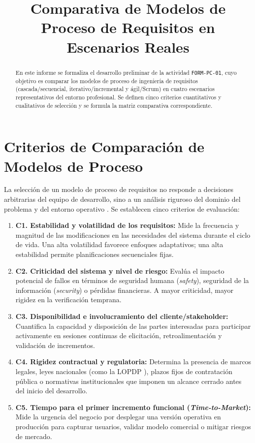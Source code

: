 \documentclass[conference]{IEEEtran}
\title{Comparativa de Modelos de Proceso de Requisitos en Escenarios Reales}
\author{
	\IEEEauthorblockN{José Ignacio Gilces Carranza}
	\IEEEauthorblockA{Universidad Técnica Estatal de Quevedo (UTEQ) --- Facultad de Ciencias de la Computación\\
		Ingeniería de Software $\cdot$ Ingeniería de Requerimientos (ISR-401) $\cdot$ Práctica en clase FORM-PC-01}
}
\begin{document}
	\onecolumn
	\maketitle
	
	\begin{abstract}
		En este informe se formaliza el desarrollo preliminar de la actividad \texttt{FORM-PC-01}, cuyo objetivo es comparar los modelos de proceso de ingeniería de requisitos (cascada/secuencial, iterativo/incremental y ágil/Scrum) en cuatro escenarios representativos del entorno profesional. Se definen cinco criterios cuantitativos y cualitativos de selección y se formula la matriz comparativa correspondiente.
	\end{abstract}
	
	\section{Criterios de Comparación de Modelos de Proceso}
	La selección de un modelo de proceso de requisitos no responde a decisiones arbitrarias del equipo de desarrollo, sino a un análisis riguroso del dominio del problema y del entorno operativo \cite{pohl2025, swebok2024}. Se establecen cinco criterios de evaluación:
	
	\begin{enumerate}
		\item \textbf{C1. Estabilidad y volatilidad de los requisitos:} Mide la frecuencia y magnitud de las modificaciones en las necesidades del sistema durante el ciclo de vida. Una alta volatilidad favorece enfoques adaptativos; una alta estabilidad permite planificaciones secuenciales fijas.
		\item \textbf{C2. Criticidad del sistema y nivel de riesgo:} Evalúa el impacto potencial de fallos en términos de seguridad humana (\emph{safety}), seguridad de la información (\emph{security}) o pérdidas financieras. A mayor criticidad, mayor rigidez en la verificación temprana.
		\item \textbf{C3. Disponibilidad e involucramiento del cliente/stakeholder:} Cuantifica la capacidad y disposición de las partes interesadas para participar activamente en sesiones continuas de elicitación, retroalimentación y validación de incrementos.
		\item \textbf{C4. Rigidez contractual y regulatoria:} Determina la presencia de marcos legales, leyes nacionales (como la LOPDP \cite{lopdp2021}), plazos fijos de contratación pública o normativas institucionales que imponen un alcance cerrado antes del inicio del desarrollo.
		\item \textbf{C5. Tiempo para el primer incremento funcional (\emph{Time-to-Market}):} Mide la urgencia del negocio por desplegar una versión operativa en producción para capturar usuarios, validar modelo comercial o mitigar riesgos de mercado.
	\end{enumerate}
	
\end{document}
